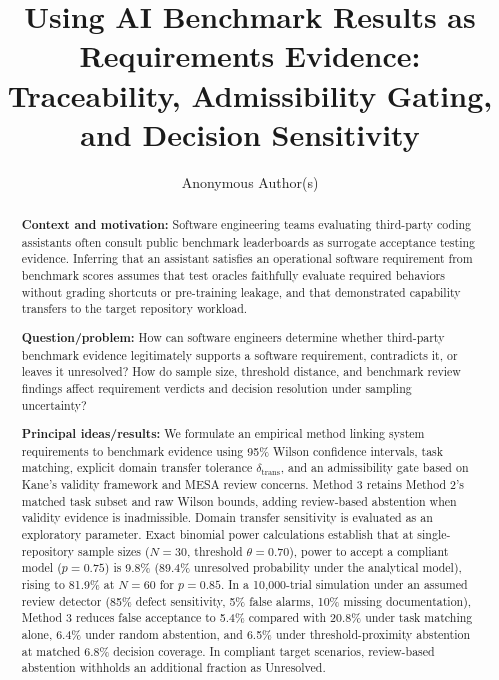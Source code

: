 \documentclass[runningheads]{llncs}
\begin{document}
\title{Using AI Benchmark Results as Requirements Evidence: Traceability, Admissibility Gating, and Decision Sensitivity}

\author{Anonymous Author(s)}


\maketitle

\begin{abstract}
\textbf{Context and motivation:} Software engineering teams evaluating third-party coding assistants often consult public benchmark leaderboards as surrogate acceptance testing evidence. Inferring that an assistant satisfies an operational software requirement from benchmark scores assumes that test oracles faithfully evaluate required behaviors without grading shortcuts or pre-training leakage, and that demonstrated capability transfers to the target repository workload.

\textbf{Question/problem:} How can software engineers determine whether third-party benchmark evidence legitimately supports a software requirement, contradicts it, or leaves it unresolved? How do sample size, threshold distance, and benchmark review findings affect requirement verdicts and decision resolution under sampling uncertainty?

\textbf{Principal ideas/results:} We formulate an empirical method linking system requirements to benchmark evidence using 95\% Wilson confidence intervals, task matching, explicit domain transfer tolerance $\delta_{\text{trans}}$, and an admissibility gate based on Kane's validity framework and MESA review concerns. Method 3 retains Method 2's matched task subset and raw Wilson bounds, adding review-based abstention when validity evidence is inadmissible. Domain transfer sensitivity is evaluated as an exploratory parameter. Exact binomial power calculations establish that at single-repository sample sizes ($N = 30$, threshold $\theta = 0.70$), power to accept a compliant model ($p = 0.75$) is 9.8\% (89.4\% unresolved probability under the analytical model), rising to 81.9\% at $N = 60$ for $p = 0.85$. In a 10,000-trial simulation under an assumed review detector (85\% defect sensitivity, 5\% false alarms, 10\% missing documentation), Method 3 reduces false acceptance to 5.4\% compared with 20.8\% under task matching alone, 6.4\% under random abstention, and 6.5\% under threshold-proximity abstention at matched 6.8\% decision coverage. In compliant target scenarios, review-based abstention withholds an additional fraction as Unresolved.


\end{abstract}
\end{document}
